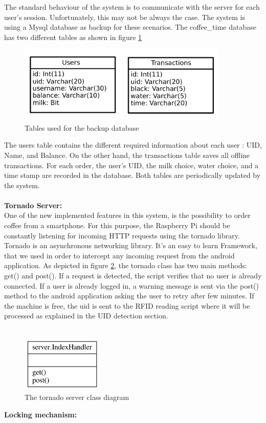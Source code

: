 \documentclass[12pt]{article}
\begin{document}
   The standard behaviour of the system is to communicate with the server for each user's session.
   Unfortunately, this may not be always the case. The system is using a Mysql database as backup for these scenarios. 
   The coffee\_time database has two different tables as shown in figure \ref{fig:offlineDB}
   
    \begin{figure}[h]
   \centering
   \includegraphics[width=10cm]{./images/offlineDB}
   \captionsetup{justification=centering}
   \caption{Tables used for the backup database}
   \label{fig:offlineDB}
   \end{figure}
  
  The users table contains the different required information about each user : UID, Name, and Balance. 
  On the other hand, the transactions table saves all offline transactions. For each order, the user's UID, the milk choice, water choice, and a time stamp are recorded in the database.
  Both tables are periodically updated by the system.\\~\\
  \textbf{Tornado Server:}\\
  
   One of the new implemented features in this system, is the possibility to order coffee from a smartphone. 
   For this purpose, the Raspberry Pi should be constantly listening for incoming HTTP requests using the tornado library.
   Tornado is an asynchronous networking library. It's an easy to learn Framework, that we used in order to intercept any incoming request from the android application.
   As depicted in figure \ref{fig:tornadoClass},
   the tornado class has two main methods: get() and post(). If a request is detected, the script verifies that no user is already connected. 
   If a user is already logged in, a warning message is sent via the post() method to the android application asking the user to retry after few minutes. 
   If the machine is free, the uid is sent to the RFID reading script where it will be processed as explained in the UID detection section.\\~\\
    \begin{figure}[H]
   \centering
   \includegraphics[width=4cm]{./images/tornadoServerClasses.pdf}
   \captionsetup{justification=centering}
   \caption{The tornado server class diagram}
   \label{fig:tornadoClass}
  \end{figure}
   \textbf{Locking mechanism:}\\
   
\end{document}
